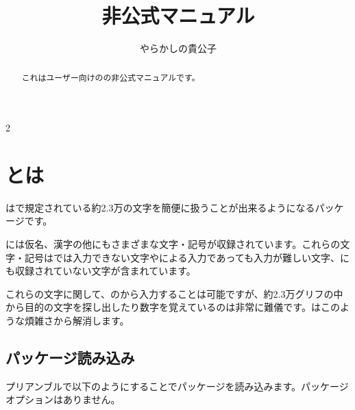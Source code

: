 \documentclass[uplatex, dvipdfmx, paper=a4paper, line_length=45zw, head_space=7zw, foot_space=10zw]{jlreq}
\title{\pkg{ajmacros}非公式マニュアル}
\author{やらかしの貴公子}
\date{\docDate}
\begin{document}

\thispagestyle{fancy}
\fancyhead{}
\fancyfoot{\docLicense}
\pagestyle{cover}

\maketitle

\begin{abstract}
  これはユーザー向けのの非公式マニュアルです。

  \vspace{0.7zw}
\end{abstract}

{
\begin{multicols*}{2}
  \small
  \tableofcontents
\end{multicols*}
}

\clearpage
{}
\setcounter{page}{1}
\pagestyle{plain}

\section{\texorpdfstring{}{ajmacrosパッケージ}とは}

は{\AdobeJapan}で規定されている約2.3万の文字を簡便に扱うことが出来るようになるパッケージです。

{\AdobeJapan}には仮名、漢字の他にもさまざまな文字・記号が収録されています。これらの文字・記号は{\ShiftJIS}では入力できない文字や{{\Unicode}}による入力であっても入力が難しい文字、{{\Unicode}}にも収録されていない文字が含まれています。

これらの文字に関して、のから入力することは可能ですが、約2.3万グリフの中から目的の文字を探し出したり数字を覚えているのは非常に難儀です。はこのような煩雑さから解消します。


\vfil
\subsection{パッケージ読み込み}

プリアンブルで以下のようにすることでパッケージを読み込みます。パッケージオプションはありません。
\end{document}
